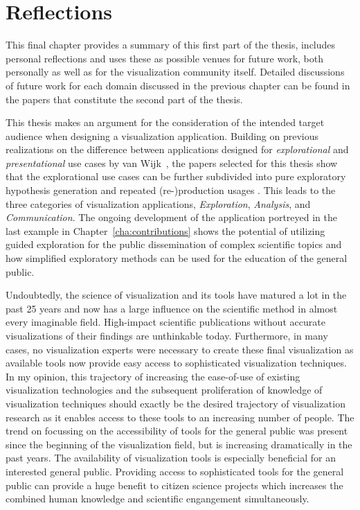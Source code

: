 \chapter{Reflections} \label{cha:reflections}

This final chapter provides a summary of this first part of the thesis, includes personal reflections and uses these as possible venues for future work, both personally as well as for the visualization community itself.  Detailed discussions of future work for each domain discussed in the previous chapter can be found in the papers that constitute the second part of the thesis.

This thesis makes an argument for the consideration of the intended target audience when designing a visualization application.  Building on previous realizations on the difference between applications designed for \emph{explorational} and \emph{presentational} use cases by van Wijk~\cite{van2005value}, the papers selected for this thesis show that the explorational use cases can be further subdivided into pure exploratory hypothesis generation and repeated (re-)production usages .  This leads to the three categories of visualization applications, \emph{Exploration}, \emph{Analysis}, and \emph{Communication}.  The ongoing development of the application portreyed in the last example in Chapter~\ref{cha:contributions} shows the potential of utilizing guided exploration for the public dissemination of complex scientific topics and how simplified exploratory methods can be used for the education of the general public.

Undoubtedly, the science of visualization and its tools have matured a lot in the past 25 years and now has a large influence on the scientific method in almost every imaginable field.  High-impact scientific publications without accurate visualizations of their findings are unthinkable today.  Furthermore, in many cases, no visualization experts were necessary to create these final visualization as available tools now provide easy access to sophisticated visualization techniques.  In my opinion, this trajectory of increasing the ease-of-use of existing visualization technologies and the subsequent proliferation of knowledge of visualization techniques should exactly be the desired trajectory of visualization research as it enables access to these tools to an increasing number of people.  The trend on focussing on the accessibility of tools for the general public was present since the beginning of the visualization field, but is increasing dramatically in the past years.  The availability of visualization tools is especially beneficial for an interested general public.  Providing access to sophisticated tools for the general public can provide a huge benefit to citizen science projects which increases the combined human knowledge and scientific engangement simultaneously.

